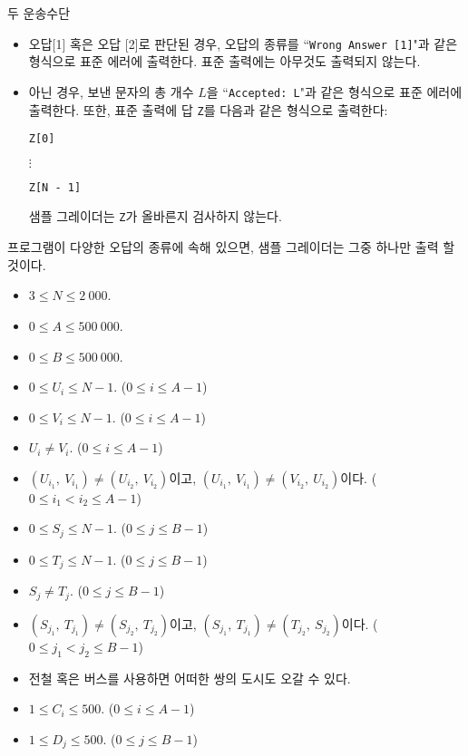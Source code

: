 \begin{problem}{두 운송수단}
	\begin{itemize}
		\item 오답[1] 혹은 오답 [2]로 판단된 경우, 오답의 종류를 ``\texttt{Wrong Answer [1]}"과 같은 형식으로 표준 에러에 출력한다. 표준 출력에는 아무것도 출력되지 않는다.
		
		\item 아닌 경우, 보낸 문자의 총 개수 $L$을 ``\texttt{Accepted: L}"과 같은 형식으로 표준 에러에 출력한다. 또한, 표준 출력에 답 \texttt{Z}를 다음과 같은 형식으로 출력한다:
		
		\texttt{Z[0]}

		$\vdots$

		\texttt{Z[N - 1]}
		
		샘플 그레이더는 \texttt{Z}가 올바른지 검사하지 않는다.
	\end{itemize}
	
	프로그램이 다양한 오답의 종류에 속해 있으면, 샘플 그레이더는 그중 하나만 출력 할 것이다.
	
	\Constraints
	
	\begin{itemize}
		\item $3 \le N \le 2\ 000$.
		\item $0 \le A \le 500\ 000$.
		\item $0 \le B \le 500\ 000$.
		\item $0 \le U_i \le N-1$. ($0 \le i \le A-1$)
		\item $0 \le V_i \le N-1$. ($0 \le i \le A-1$)
		\item $U_i \ne V_i$. ($0 \le i \le A-1$)
		\item $(U_{i_1},\ V_{i_1}) \ne (U_{i_2},\ V_{i_2})$이고, $(U_{i_1},\ V_{i_1}) \ne (V_{i_2},\ U_{i_2})$이다. ($0 \le i_1 < i_2 \le A-1$)
		\item $0 \le S_j \le N-1$. ($0 \le j \le B-1$)
		\item $0 \le T_j \le N-1$. ($0 \le j \le B-1$)
		\item $S_j \ne T_j$. ($0 \le j \le B-1$)
		\item $(S_{j_1},\ T_{j_1}) \ne (S_{j_2},\ T_{j_2})$이고, $(S_{j_1},\ T_{j_1}) \ne (T_{j_2},\ S_{j_2})$이다. ($0 \le j_1 < j_2 \le B-1$)
		\item 전철 혹은 버스를 사용하면 어떠한 쌍의 도시도 오갈 수 있다.
		\item $1 \le C_i \le 500$. ($0 \le i \le A-1$)
		\item $1 \le D_j \le 500$. ($0 \le j \le B-1$) 
	\end{itemize}
	

\end{problem}
